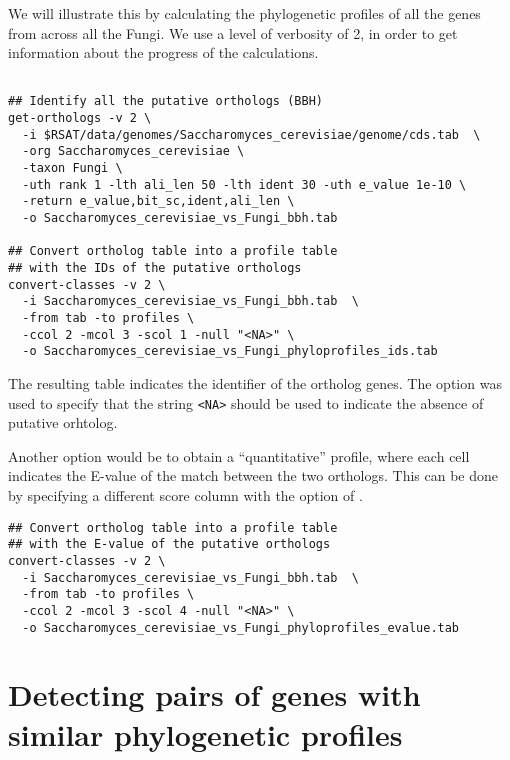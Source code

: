 We will illustrate this by calculating the phylogenetic profiles of
all the genes from  across all the
Fungi. We use a level of verbosity of 2, in order to get information
about the progress of the calculations.

\begin{footnotesize}
\begin{verbatim}

## Identify all the putative orthologs (BBH)
get-orthologs -v 2 \
  -i $RSAT/data/genomes/Saccharomyces_cerevisiae/genome/cds.tab  \
  -org Saccharomyces_cerevisiae \
  -taxon Fungi \
  -uth rank 1 -lth ali_len 50 -lth ident 30 -uth e_value 1e-10 \
  -return e_value,bit_sc,ident,ali_len \
  -o Saccharomyces_cerevisiae_vs_Fungi_bbh.tab

## Convert ortholog table into a profile table
## with the IDs of the putative orthologs
convert-classes -v 2 \
  -i Saccharomyces_cerevisiae_vs_Fungi_bbh.tab  \
  -from tab -to profiles \
  -ccol 2 -mcol 3 -scol 1 -null "<NA>" \
  -o Saccharomyces_cerevisiae_vs_Fungi_phyloprofiles_ids.tab

\end{verbatim}
\end{footnotesize}


The resulting table indicates the identifier of the ortholog
genes. The option \option{-null} was used to specify that the string
\texttt{<NA>} should be used to indicate the absence of putative
orhtolog.

Another option would be to obtain a ``quantitative'' profile, where
each cell indicates the E-value of the match between the two
orthologs. This can be done by specifying a different score column
with the option  of .

\begin{footnotesize}
\begin{verbatim}
## Convert ortholog table into a profile table
## with the E-value of the putative orthologs
convert-classes -v 2 \
  -i Saccharomyces_cerevisiae_vs_Fungi_bbh.tab  \
  -from tab -to profiles \
  -ccol 2 -mcol 3 -scol 4 -null "<NA>" \
  -o Saccharomyces_cerevisiae_vs_Fungi_phyloprofiles_evalue.tab
\end{verbatim}
\end{footnotesize}

\section{Detecting pairs of genes with similar phylogenetic profiles}


